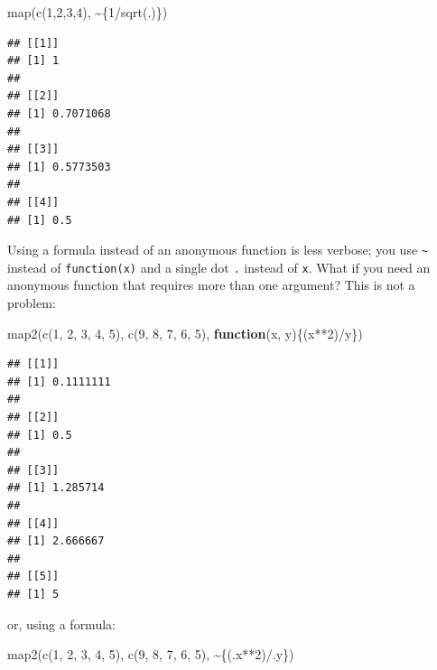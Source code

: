 \documentclass[
]{article}
\newenvironment{Shaded}{\begin{snugshade}}{\end{snugshade}}
\newcommand{\ControlFlowTok}[1]{\textcolor[rgb]{0.13,0.29,0.53}{\textbf{#1}}}
\newcommand{\DecValTok}[1]{\textcolor[rgb]{0.00,0.00,0.81}{#1}}
\newcommand{\FunctionTok}[1]{\textcolor[rgb]{0.00,0.00,0.00}{#1}}
\newcommand{\NormalTok}[1]{#1}
\newcommand{\SpecialCharTok}[1]{\textcolor[rgb]{0.00,0.00,0.00}{#1}}
\begin{document}
\begin{Shaded}
\begin{Highlighting}[]
\FunctionTok{map}\NormalTok{(}\FunctionTok{c}\NormalTok{(}\DecValTok{1}\NormalTok{,}\DecValTok{2}\NormalTok{,}\DecValTok{3}\NormalTok{,}\DecValTok{4}\NormalTok{), }\SpecialCharTok{\textasciitilde{}}\NormalTok{\{}\DecValTok{1}\SpecialCharTok{/}\FunctionTok{sqrt}\NormalTok{(.)\})}
\end{Highlighting}
\end{Shaded}

\begin{verbatim}
## [[1]]
## [1] 1
## 
## [[2]]
## [1] 0.7071068
## 
## [[3]]
## [1] 0.5773503
## 
## [[4]]
## [1] 0.5
\end{verbatim}

Using a formula instead of an anonymous function is less verbose; you use \texttt{\textasciitilde{}} instead of \texttt{function(x)}
and a single dot \texttt{.} instead of \texttt{x}. What if you need an anonymous function that requires more than
one argument? This is not a problem:

\begin{Shaded}
\begin{Highlighting}[]
\FunctionTok{map2}\NormalTok{(}\FunctionTok{c}\NormalTok{(}\DecValTok{1}\NormalTok{, }\DecValTok{2}\NormalTok{, }\DecValTok{3}\NormalTok{, }\DecValTok{4}\NormalTok{, }\DecValTok{5}\NormalTok{), }\FunctionTok{c}\NormalTok{(}\DecValTok{9}\NormalTok{, }\DecValTok{8}\NormalTok{, }\DecValTok{7}\NormalTok{, }\DecValTok{6}\NormalTok{, }\DecValTok{5}\NormalTok{), }\ControlFlowTok{function}\NormalTok{(x, y)\{(x}\SpecialCharTok{**}\DecValTok{2}\NormalTok{)}\SpecialCharTok{/}\NormalTok{y\})}
\end{Highlighting}
\end{Shaded}

\begin{verbatim}
## [[1]]
## [1] 0.1111111
## 
## [[2]]
## [1] 0.5
## 
## [[3]]
## [1] 1.285714
## 
## [[4]]
## [1] 2.666667
## 
## [[5]]
## [1] 5
\end{verbatim}

or, using a formula:

\begin{Shaded}
\begin{Highlighting}[]
\FunctionTok{map2}\NormalTok{(}\FunctionTok{c}\NormalTok{(}\DecValTok{1}\NormalTok{, }\DecValTok{2}\NormalTok{, }\DecValTok{3}\NormalTok{, }\DecValTok{4}\NormalTok{, }\DecValTok{5}\NormalTok{), }\FunctionTok{c}\NormalTok{(}\DecValTok{9}\NormalTok{, }\DecValTok{8}\NormalTok{, }\DecValTok{7}\NormalTok{, }\DecValTok{6}\NormalTok{, }\DecValTok{5}\NormalTok{), }\SpecialCharTok{\textasciitilde{}}\NormalTok{\{(.x}\SpecialCharTok{**}\DecValTok{2}\NormalTok{)}\SpecialCharTok{/}\NormalTok{.y\})}
\end{Highlighting}
\end{Shaded}
\end{document}
